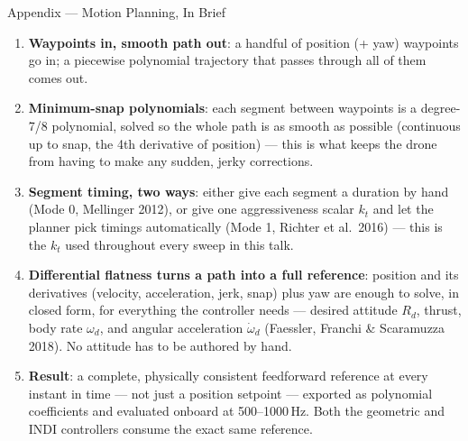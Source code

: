 \documentclass[aspectratio=169,11pt]{beamer}
\begin{document}
\begin{frame}{Appendix --- Motion Planning, In Brief}
\begin{small}
\begin{enumerate}
  \setlength{\itemsep}{0.25cm}
  \item \textbf{Waypoints in, smooth path out}: a handful of position (+ yaw) waypoints go in;
        a piecewise polynomial trajectory that passes through all of them comes out.
  \item \textbf{Minimum-snap polynomials}: each segment between waypoints is a degree-7/8
        polynomial, solved so the whole path is as smooth as possible (continuous up to snap,
        the 4th derivative of position) --- this is what keeps the drone from having to make any
        sudden, jerky corrections.
  \item \textbf{Segment timing, two ways}: either give each segment a duration by hand (Mode 0,
        Mellinger 2012), or give one aggressiveness scalar $k_t$ and let the planner pick
        timings automatically (Mode 1, Richter et al.\ 2016) --- this is the $k_t$ used
        throughout every sweep in this talk.
  \item \textbf{Differential flatness turns a path into a full reference}: position and its
        derivatives (velocity, acceleration, jerk, snap) plus yaw are enough to solve, in closed
        form, for everything the controller needs --- desired attitude $R_d$, thrust, body rate
        $\omega_d$, and angular acceleration $\dot\omega_d$ (Faessler, Franchi \& Scaramuzza 2018).
        No attitude has to be authored by hand.
  \item \textbf{Result}: a complete, physically consistent feedforward reference at every instant
        in time --- not just a position setpoint --- exported as polynomial coefficients and
        evaluated onboard at 500--1000\,Hz. Both the geometric and INDI controllers consume the
        exact same reference.
\end{enumerate}
\end{small}
\end{frame}
\end{document}
